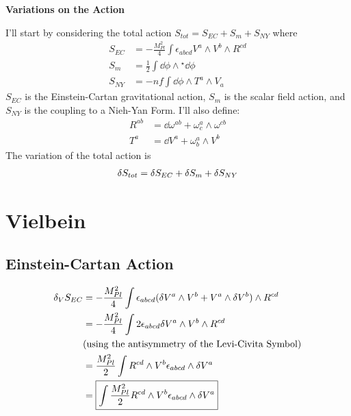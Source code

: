 \documentclass[12pt]{article}
\newcommand{\hodge}{{^\star}}
\begin{document}
\begin{center}
  \Large\textbf{Variations on the Action} \\
  \large{}
\end{center}

I'll start by considering the total action $S_{tot} = S_{EC} + S_m + S_{NY}$ where
\begin{align}
  S_{EC} &= -\frac{M_{Pl}^2}{4}\int\epsilon_{abcd}V^a \wedge V^b \wedge R^{cd} \\
  S_m &= \frac{1}{2}\int\dd\phi\wedge\hodge\dd\phi \\
  S_{NY} &= -\mathit{nf}\int\dd\phi\wedge T^a \wedge V_a
\end{align}
$S_{EC}$ is the Einstein-Cartan gravitational action, $S_m$ is the scalar field action, and $S_{NY}$ is the coupling to a Nieh-Yan Form. I'll also define:
\begin{align*}
  R^{ab} &= \dd\omega^{ab} + \omega^a_c \wedge \omega^{cb} \\
  T^a &= \dd V^a + \omega^a_b \wedge V^b
\end{align*}
The variation of the total action is
\begin{align}
  \var{S_{tot}} = \var{S_{EC}} + \var{S_m} + \var{S_{NY}}
\end{align}

\section{Vielbein}
\subsection{Einstein-Cartan Action}
\begin{align}
  \var_V{S_{EC}} &= -\frac{M_{Pl}^2}{4}\int \epsilon_{abcd}(\var V^a \wedge V^b + V^a \wedge \var V^b) \wedge R^{cd} \nonumber \\
  &= -\frac{M_{Pl}^2}{4}\int 2\epsilon_{abcd}\var V^a \wedge V^b \wedge R^{cd} \nonumber \\ &\text{(using the antisymmetry of the Levi-Civita Symbol)} \nonumber\\
  &= \frac{M_{Pl}^2}{2}\int R^{cd} \wedge V^b \epsilon_{abcd} \wedge \var V^a \nonumber \\
  &= \boxed{\int \frac{M_{Pl}^2}{2} R^{cd} \wedge V^b \epsilon_{abcd} \wedge \var V^a}
\end{align}
\end{document}
